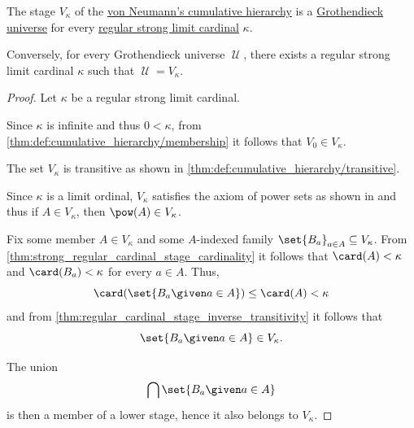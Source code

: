 \begin{proposition}\label{thm:grothendieck_universe_iff_regular_strong_limit}
  The stage \( V_\kappa \) of the \hyperref[def:cumulative_hierarchy]{von Neumann's cumulative hierarchy} is a \hyperref[def:grothendieck_universe]{Grothendieck universe} for every \hyperref[rem:strongly_inaccessible_cardinal]{regular strong limit cardinal} \( \kappa \).

  Conversely, for every Grothendieck universe \( \mscrU \), there exists a regular strong limit cardinal \( \kappa \) such that \( \mscrU = V_\kappa \).
\end{proposition}
\begin{proof}
  \SufficiencySubProof Let \( \kappa \) be a regular strong limit cardinal.

   Since \( \kappa \) is infinite and thus \( 0 < \kappa \), from \cref{thm:def:cumulative_hierarchy/membership} it follows that \( V_0 \in V_\kappa \).

   The set \( V_\kappa \) is transitive as shown in \cref{thm:def:cumulative_hierarchy/transitive}.

   Since \( \kappa \) is a limit ordinal, \( V_\kappa \) satisfies the axiom of power sets as shown in  and thus if \( A \in V_\kappa \), then \( \pow(A) \in V_\kappa \).

   Fix some member \( A \in V_\kappa \) and some \( A \)-indexed family \( \set{ B_a }_{a \in A} \subseteq V_\kappa \). From \cref{thm:strong_regular_cardinal_stage_cardinality} it follows that \( \card(A) < \kappa \) and \( \card(B_a) < \kappa \) for every \( a \in A \). Thus,
  \begin{equation*}
    \card(\set{ B_a \given a \in A }) \leq \card(A) < \kappa
  \end{equation*}
  and from \cref{thm:regular_cardinal_stage_inverse_transitivity} it follows that
  \begin{equation*}
    \set{ B_a \given a \in A } \in V_\kappa.
  \end{equation*}

  The union
  \begin{equation*}
    \bigcap \set{ B_a \given a \in A }
  \end{equation*}
  is then a member of a lower stage, hence it also belongs to \( V_\kappa \).


\end{proof}
